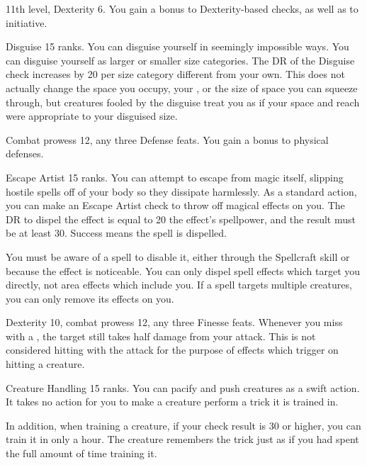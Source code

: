 \featpres 11th level, Dexterity 6.
\featben You gain a  bonus to Dexterity-based checks, as well as to initiative.

\featpre Disguise 15 ranks.
\featben You can disguise yourself in seemingly impossible ways.
You can disguise yourself as larger or smaller size categories.
The DR of the Disguise check increases by 20 per size category different from your own.
This does not actually change the space you occupy, your , or the size of space you can squeeze through, but creatures fooled by the disguise treat you as if your space and reach were appropriate to your disguised size.

\featpres Combat prowess 12, any three Defense feats.
\featben You gain a  bonus to physical defenses.

\featpre Escape Artist 15 ranks.
\featben You can attempt to escape from magic itself, slipping hostile spells off of your body so they dissipate harmlessly.
As a standard action, you can make an Escape Artist check to throw off magical effects on you.
The DR to dispel the effect is equal to 20 \add the effect's spellpower, and the result must be at least 30.
Success means the spell is dispelled.

You must be aware of a spell to disable it, either through the Spellcraft skill or because the effect is noticeable.
You can only dispel spell effects which target you directly, not area effects which include you.
If a spell targets multiple creatures, you can only remove its effects on you.

\featpres Dexterity 10, combat prowess 12, any three Finesse feats.
\featben Whenever you miss with a , the target still takes half damage from your attack.
This is not considered hitting with the attack for the purpose of effects which trigger on hitting a creature.

\featpre Creature Handling 15 ranks.
\featben You can pacify and push creatures as a swift action.
It takes no action for you to make a creature perform a trick it is trained in.

In addition, when training a creature, if your check result is 30 or higher, you can train it in only a hour.
The creature remembers the trick just as if you had spent the full amount of time training it.

